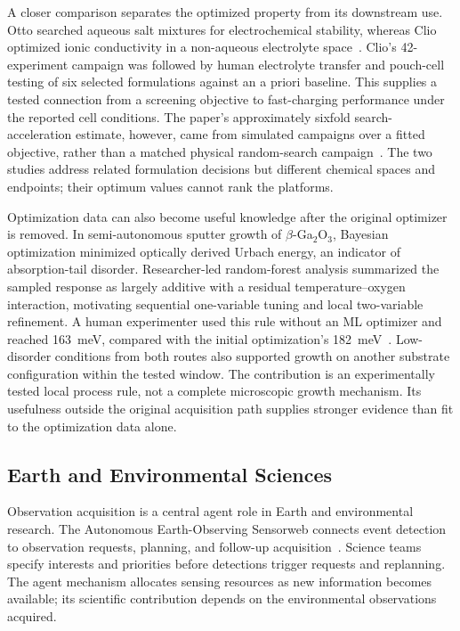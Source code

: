 A closer comparison separates the optimized property from its downstream use. Otto searched aqueous salt mixtures for electrochemical stability, whereas Clio optimized ionic conductivity in a non-aqueous electrolyte space~\cite{asd0487,asd0417}. Clio's 42-experiment campaign was followed by human electrolyte transfer and pouch-cell testing of six selected formulations against an a priori baseline. This supplies a tested connection from a screening objective to fast-charging performance under the reported cell conditions. The paper's approximately sixfold search-acceleration estimate, however, came from simulated campaigns over a fitted objective, rather than a matched physical random-search campaign~\cite{asd0417}. The two studies address related formulation decisions but different chemical spaces and endpoints; their optimum values cannot rank the platforms.

Optimization data can also become useful knowledge after the original optimizer is removed. In semi-autonomous sputter growth of $\beta$-Ga$_2$O$_3$, Bayesian optimization minimized optically derived Urbach energy, an indicator of absorption-tail disorder. Researcher-led random-forest analysis summarized the sampled response as largely additive with a residual temperature--oxygen interaction, motivating sequential one-variable tuning and local two-variable refinement. A human experimenter used this rule without an ML optimizer and reached 163~meV, compared with the initial optimization's 182~meV~\cite{asd0999}. Low-disorder conditions from both routes also supported growth on another substrate configuration within the tested window. The contribution is an experimentally tested local process rule, not a complete microscopic growth mechanism. Its usefulness outside the original acquisition path supplies stronger evidence than fit to the optimization data alone.

\subsection{Earth and Environmental Sciences}

Observation acquisition is a central agent role in Earth and environmental research. The Autonomous Earth-Observing Sensorweb connects event detection to observation requests, planning, and follow-up acquisition~\cite{asd0722}. Science teams specify interests and priorities before detections trigger requests and replanning. The agent mechanism allocates sensing resources as new information becomes available; its scientific contribution depends on the environmental observations acquired.


